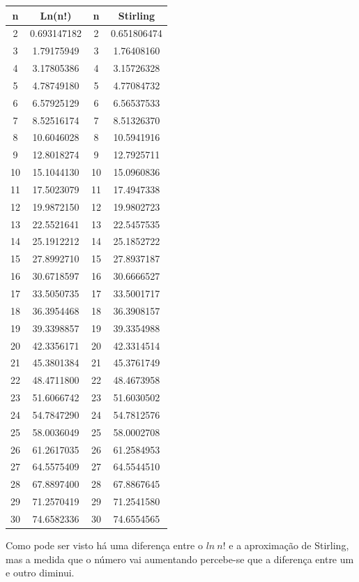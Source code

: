 \documentclass[a4paper, 12pt]{article}
\begin{document}
\begin{table}[H]
\centering

\begin{tabular}{ c | c | c | c }

	n & Ln(n!) & n & Stirling \\ \hline
	2 &   0.693147182     & 2 &   0.651806474     \\ \hline
	3 &    1.79175949     & 3 &    1.76408160     \\ \hline
	4 &    3.17805386     & 4 &    3.15726328     \\ \hline
	5 &    4.78749180     & 5 &    4.77084732     \\ \hline
	6 &    6.57925129     & 6 &    6.56537533     \\ \hline
	7 &    8.52516174     & 7 &    8.51326370     \\ \hline
	8 &    10.6046028     & 8 &    10.5941916     \\ \hline
	9 &    12.8018274     & 9 &    12.7925711     \\ \hline
	10 &    15.1044130     & 10 &    15.0960836     \\ \hline
	11 &    17.5023079     & 11 &    17.4947338     \\ \hline
	12 &    19.9872150     & 12 &    19.9802723     \\ \hline
	13 &    22.5521641     & 13 &    22.5457535     \\ \hline
	14 &    25.1912212     & 14 &    25.1852722     \\ \hline
	15 &    27.8992710     & 15 &    27.8937187     \\ \hline
	16 &    30.6718597     & 16 &    30.6666527     \\ \hline
	17 &    33.5050735     & 17 &    33.5001717     \\ \hline
	18 &    36.3954468     & 18 &    36.3908157     \\ \hline
	19 &    39.3398857     & 19 &    39.3354988     \\ \hline
	20 &    42.3356171     & 20 &    42.3314514     \\ \hline
	21 &    45.3801384     & 21 &    45.3761749     \\ \hline
	22 &    48.4711800     & 22 &    48.4673958     \\ \hline
	23 &    51.6066742     & 23 &    51.6030502     \\ \hline
	24 &    54.7847290     & 24 &    54.7812576     \\ \hline
	25 &    58.0036049     & 25 &    58.0002708     \\ \hline
	26 &    61.2617035     & 26 &    61.2584953     \\ \hline
	27 &    64.5575409     & 27 &    64.5544510     \\ \hline
	28 &    67.8897400     & 28 &    67.8867645     \\ \hline
	29 &    71.2570419     & 29 &    71.2541580     \\ \hline
	30 &    74.6582336     & 30 &    74.6554565
\end{tabular}
\end{table}
Como pode ser visto há uma diferença entre o $ln \: n!$ e a aproximação de Stirling, mas a medida que o número vai aumentando percebe-se que a diferença entre um e outro diminui.
\end{document}
